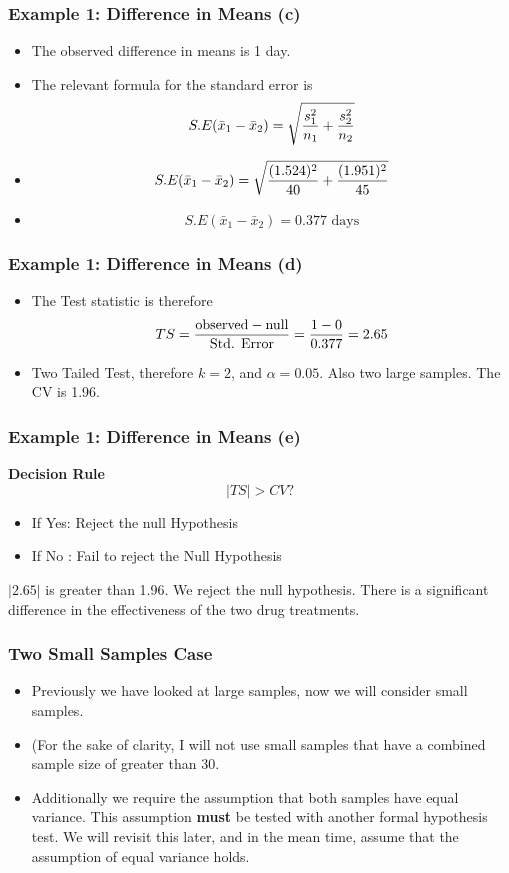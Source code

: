 \documentclass[a4]{beamer}
\begin{document}
\begin{frame}
\frametitle{Example 1: Difference in Means (c) }
\begin{itemize}
\item The observed difference in means is 1 day.
\item The relevant formula for the standard error is
\[ S.E(\bar{x}_1 - \bar{x}_2) = \sqrt{{s^2_1\over n_1}+{s^2_2 \over n_2}} \]
\item  \[ S.E(\bar{x}_1 - \bar{x}_2) = \sqrt{{(1.524)^2 \over 40}+{(1.951)^2 \over 45}}   \]
\item  \[ S.E(\bar{x}_1 - \bar{x}_2) = 0.377\mbox{ days}\]
\end{itemize}
\end{frame}
\begin{frame}
\frametitle{Example 1: Difference in Means (d) }
\begin{itemize}
\item The Test statistic is therefore
\[ TS = {\mbox{observed} - \mbox{null} \over \mbox{Std. Error}}  = {1 - 0 \over 0.377 } = 2.65 \]
\item Two Tailed Test, therefore $k = 2$, and $\alpha = 0.05$. Also two large samples. The CV is 1.96.
\end{itemize}
\end{frame}


\begin{frame}
\frametitle{Example 1: Difference in Means (e) }
\textbf{Decision Rule}
\[ |TS| > CV ?  \]
\begin{itemize}
\item If Yes: Reject the null Hypothesis
\item If No : Fail to reject the Null Hypothesis
\end{itemize}
$|2.65|$ is greater than 1.96. We reject the null hypothesis. There is a significant difference in the effectiveness of the two drug treatments.
\end{frame}




\begin{frame}
\frametitle{Two Small Samples Case}
\begin{itemize}
\item Previously we have looked at large samples, now we will consider small samples.
\item (For the sake of clarity, I will not use small samples that have a combined sample size of greater than 30.
\item Additionally we require the assumption that both samples have equal variance. This assumption \textbf{must} be tested with another formal hypothesis test. We will revisit this later, and in the mean time, assume that the assumption of equal variance holds.
\end{itemize}
\end{frame}
\end{document}
